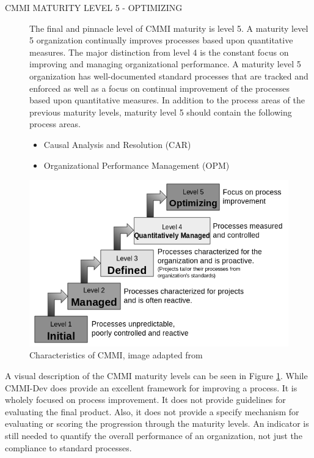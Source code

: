 \documentclass[SDSUThesis.tex]{subfiles}
\begin{document}
\begin{description}
        \item[CMMI MATURITY LEVEL 5 - OPTIMIZING]
            The final and pinnacle level of CMMI maturity is level 5.  
            A maturity level 5 organization
            continually improves processes based upon quantitative measures.  
            The major distinction from 
            level 4 is the constant focus on improving and managing 
            organizational performance.  A maturity level
            5 organization has well-documented standard processes that are 
            tracked and enforced as well as
            a focus on continual improvement of the processes based upon 
            quantitative measures.  In addition to the process areas of the 
            previous maturity levels, maturity
            level 5 should contain the following process areas.
            \begin{itemize}
                \item Causal Analysis and Resolution (CAR)
                \item Organizational Performance Management (OPM)
            \end{itemize}
    \end{description}

    \begin{figure}[ht]
        \centering
        \includegraphics[scale=.7]{images/cmmi.png}
        \caption[Characteristics of CMMI]{Characteristics of CMMI, 
            image adapted from  \cite{Godfrey} }
        \label{fig:cmmi}
    \end{figure}

    A visual description of the CMMI maturity levels can be seen in Figure \ref{fig:cmmi}.  
    While CMMI-Dev does provide an excellent framework for improving a process.  It
    is wholely focused on process improvement.  It does not provide guidelines
    for evaluating the final product.  
    Also, it does not provide a specify mechanism for evaluating
    or scoring the progression through the maturity levels.  
    An indicator is still needed to quantify the overall 
    performance of an organization, not
    just the compliance to standard processes.  
\end{document}
